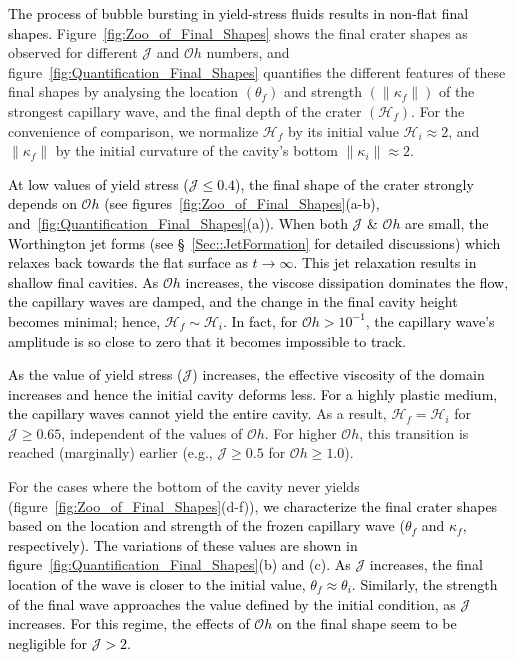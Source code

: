 \documentclass[final]{jfm}
\newcommand*\red{\textcolor{black}}
\begin{document}
\red{The process of bubble bursting in yield-stress fluids results in non-flat final shapes.}
Figure~\ref{fig:Zoo_of_Final_Shapes} shows the final crater shapes as observed for different $\mathcal{J}$ and $\mathcal{O}h$ numbers, and figure~\ref{fig:Quantification_Final_Shapes} quantifies the different features of these final shapes by analysing the location $\left(\theta_f\right)$ and strength $\left(\|\kappa_f\|\right)$ of the strongest capillary wave, and the final depth of the crater $\left(\mathcal{H}_f\right)$. For the convenience of comparison, we normalize $\mathcal{H}_f$ by its initial value $\mathcal{H}_i \approx 2$, and $\|\kappa_f\|$ by the initial curvature of the cavity's bottom $\|\kappa_i\| \approx 2$. 

\red{At low values of yield stress ($\mathcal{J} \le 0.4$), the final shape of the crater strongly depends on $\mathcal{O}h$ (see figures~\ref{fig:Zoo_of_Final_Shapes}(a-b), and~\ref{fig:Quantification_Final_Shapes}(a)).}
\red{When both $\mathcal{J}$ \& $\mathcal{O}h$ are small, the Worthington jet forms (see \S~\ref{Sec::JetFormation} for detailed discussions) which relaxes back towards the flat surface as $t \to \infty$. This jet relaxation results in shallow final cavities.}
\red{As $\mathcal{O}h$ increases, the viscose dissipation dominates the flow, the capillary waves are damped, and the change in the final cavity height becomes minimal; hence, $\mathcal{H}_f \sim \mathcal{H}_i$. In fact, for $\mathcal{O}h > 10^{-1}$, the capillary wave's amplitude is so close to zero that it becomes impossible to track.}

\red{As the value of yield stress ($\mathcal{J}$) increases, the effective viscosity of the domain increases and hence the initial cavity deforms less. For a highly plastic medium, the capillary waves cannot yield the entire cavity.} As a result, $\mathcal{H}_f = \mathcal{H}_i$ for $\mathcal{J} \ge 0.65$, independent of the values of $\mathcal{O}h$. For higher $\mathcal{O}h$, this transition is reached (marginally) earlier (e.g., $\mathcal{J} \ge 0.5$ for $\mathcal{O}h \ge 1.0$).

For the cases where the bottom of the cavity never yields (figure~\ref{fig:Zoo_of_Final_Shapes}(d-f)), \red{we characterize the final crater shapes based on the location and strength of the frozen capillary wave ($\theta_f$ and $\kappa_f$, respectively). The variations of these values are shown in figure~\ref{fig:Quantification_Final_Shapes}(b) and (c). As $\mathcal{J}$ increases, the final location of the wave is closer to the initial value, $\theta_f \approx \theta_i$. Similarly, the strength of the final wave approaches the value defined by the initial condition, as $\mathcal{J}$ increases. For this regime, the effects of $\mathcal{O}h$ on the final shape seem to be negligible for $\mathcal{J} > 2$. }
\end{document}
